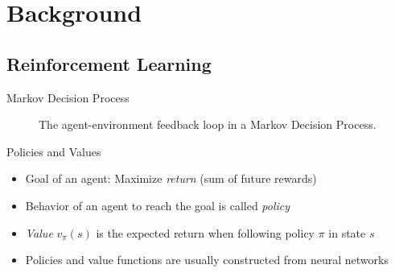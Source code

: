 \section{Background}

\subsection{Reinforcement Learning}

\begin{frame}[fragile]{Markov Decision Process}
    \begin{figure}
        \centering
        \caption{The agent-environment feedback loop in a Markov Decision Process. \cite{bible}}
        \label{fig:mdp_visualization}
    \end{figure}
\end{frame}

\begin{frame}{Policies and Values}
    \begin{itemize}
        \item Goal of an agent: Maximize \textit{return} (sum of future rewards)
        \item Behavior of an agent to reach the goal is called \textit{policy}
        \item \textit{Value} $v_\pi(s)$ is the expected return when following policy $\pi$ in state $s$
        \item Policies and value functions are usually constructed from neural networks
    \end{itemize}
\end{frame}

